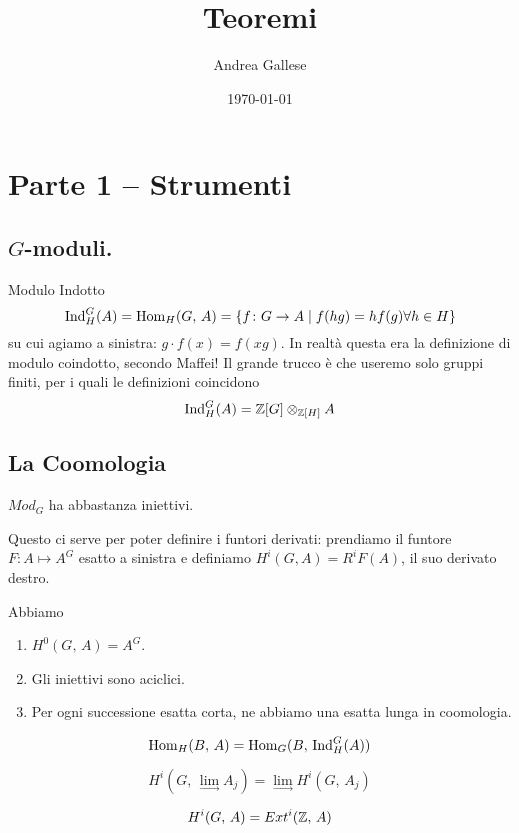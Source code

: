 \documentclass[a4paper]{article}
\title{Teoremi}\let\Title\@title
\author{Andrea Gallese}\let\Author\@author
\date{\today}\let\Date\@date
\begin{document}
	\section{Parte 1 -- Strumenti}
	
	\subsection{$ G $-moduli.}
	\begin{definition}{Modulo Indotto}
		\[ \mathrm{Ind}_H^G(A) = \mathrm{Hom}_H(G, \, A) = \{ f \colon G \to A \mid f(hg) = h f(g) \forall h \in H \} \]
		su cui agiamo a sinistra: $ g \cdot f(x) = f(xg) $. In realtà questa era la definizione di modulo coindotto, secondo Maffei! Il grande trucco è che useremo solo gruppi finiti, per i quali le definizioni coincidono
		\[ \mathrm{Ind}_H^G(A) = \mathbb{Z}[G] \otimes_{\mathbb{Z}[H]} A \]
	\end{definition}

	\subsection{La Coomologia}
	\begin{theorem}
		$ Mod_G $ ha abbastanza iniettivi.
	\end{theorem}

	Questo ci serve per poter definire i funtori derivati: prendiamo il funtore $ F \colon A \mapsto A^G $ esatto a sinistra e definiamo $ H^i(G, A) = R^iF(A) $, il suo derivato destro.
	
	\begin{theorem}
		Abbiamo
		\begin{enumerate}
			\item $ H^0(G,\, A) = A^G $.
			\item Gli iniettivi sono aciclici.
			\item Per ogni successione esatta corta, ne abbiamo una esatta lunga in coomologia.
		\end{enumerate}
	\end{theorem}

	\begin{theorem}
		\[ \mathrm{Hom}_H(B,\, A) = \mathrm{Hom}_G(B, \, \mathrm{Ind}_H^G(A)) \]
	\end{theorem}

	\begin{theorem}
		\[ H^i(G, \, \lim_{\rightarrow} A_j) =  \lim_{\rightarrow}H^i(G, \, A_j) \]
	\end{theorem}

	\begin{theorem}
		\[ H^i(G, \, A) = Ext^i(\mathbb{Z}, \, A) \]
	\end{theorem}
\end{document}
